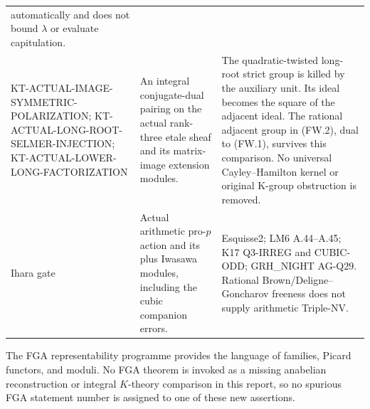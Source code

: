 \begin{longtable}{>{\raggedright\arraybackslash}p{}
>{\raggedright\arraybackslash}p{}
>{\raggedright\arraybackslash}p{}}
automatically and does not bound $\lambda$ or evaluate capitulation.\\
KT-ACTUAL-IMAGE-SYMMETRIC-POLARIZATION;
KT-ACTUAL-LONG-ROOT-SELMER-INJECTION;
KT-ACTUAL-LOWER-LONG-FACTORIZATION &
An integral conjugate-dual pairing on the actual rank-three
etale sheaf and its matrix-image extension modules. &
The quadratic-twisted long-root strict group is killed by
the auxiliary unit. Its ideal becomes the square of the
adjacent ideal. The rational adjacent group in (FW.2),
dual to (FW.1), survives this comparison. No universal
Cayley--Hamilton kernel or original K-group obstruction is removed.\\
Ihara gate &
Actual arithmetic pro-$p$ action and its plus Iwasawa modules,
including the cubic companion errors. &
Esquisse2; LM6 A.44--A.45; K17 Q3-IRREG and CUBIC-ODD;
GRH\_NIGHT AG-Q29. Rational Brown/Deligne--Goncharov
freeness does not supply arithmetic Triple-NV.\\
\bottomrule
\end{longtable}
\normalsize

The FGA representability programme provides the language of
families, Picard functors, and moduli. No FGA theorem is
invoked as a missing anabelian reconstruction or integral
$K$-theory comparison in this report, so no spurious FGA
statement number is assigned to one of these new assertions.
